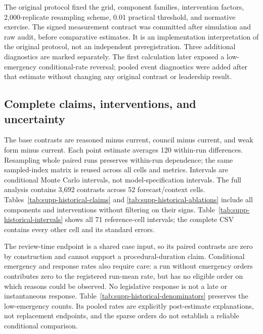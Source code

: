\documentclass[
  journal=small,
  manuscript=research-article,
  year=2026
]{cup-journal}
\begin{document}


The original protocol fixed the grid, component families, intervention factors, 2,000-replicate resampling scheme, 0.01 practical threshold, and normative exercise. The signed measurement contract was committed after simulation and raw audit, before comparative estimates. It is an implementation interpretation of the original protocol, not an independent preregistration. Three additional diagnostics are marked separately. The first calculation later exposed a low-emergency conditional-rate reversal; pooled event diagnostics were added after that estimate without changing any original contrast or leadership result.

\subsection*{Complete claims, interventions, and uncertainty}

The base contrasts are reasoned minus current, council minus current, and weak form minus current. Each point estimate averages 120 within-run differences. Resampling whole paired runs preserves within-run dependence; the same sampled-index matrix is reused across all cells and metrics. Intervals are conditional Monte Carlo intervals, not model-specification intervals. The full analysis contains 3,692 contrasts across 52 forecast/context cells. Tables~\ref{tab:supp-historical-claims} and \ref{tab:supp-historical-ablations} include all components and interventions without filtering on their signs. Table~\ref{tab:supp-historical-intervals} shows all 71 reference-cell intervals; the complete CSV contains every other cell and its standard errors.





The review-time endpoint is a shared case input, so its paired contrasts are zero by construction and cannot support a procedural-duration claim. Conditional emergency and response rates also require care: a run without emergency orders contributes zero to the registered run-mean rate, but has no eligible order on which reasons could be observed. No legislative response is not a late or instantaneous response. Table~\ref{tab:supp-historical-denominators} preserves the low-emergency counts. Its pooled rates are explicitly post-estimate explanations, not replacement endpoints, and the sparse orders do not establish a reliable conditional comparison.
\end{document}
